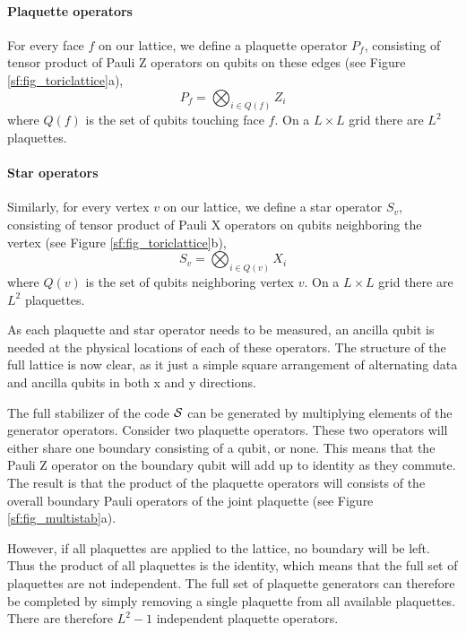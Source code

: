 \paragraph{Plaquette operators}
For every face $f$ on our lattice, we define a plaquette operator $P_f$, consisting of tensor product of Pauli Z operators on qubits on these edges (see Figure \ref{sf:fig_toriclattice}a),
\begin{equation}\label{eq:sf_plaquette}
  P_f = \bigotimes_{i\in Q(f)} Z_i
\end{equation}
where $Q(f)$ is the set of qubits touching face $f$. On a $L\times L$ grid there are $L^2$ plaquettes.

\paragraph{Star operators}

Similarly, for every vertex $v$ on our lattice, we define a star operator $S_v$, consisting of tensor product of Pauli X operators on qubits neighboring the vertex (see Figure \ref{sf:fig_toriclattice}b),
\begin{equation}\label{eq:sf_star}
  S_v = \bigotimes_{i\in Q(v)} X_i
\end{equation}
where $Q(v)$ is the set of qubits neighboring vertex $v$. On a $L\times L$ grid there are $L^2$ plaquettes.

As each plaquette and star operator needs to be measured, an ancilla qubit is needed at the physical locations of each of these operators. The structure of the full lattice is now clear, as it just a simple square arrangement of alternating data and ancilla qubits in both x and y directions.

The full stabilizer of the code $\mathcal{S}$ can be generated by multiplying elements of the generator operators. Consider two plaquette operators. These two operators will either share one boundary consisting of a qubit, or none. This means that the Pauli Z operator on the boundary qubit will add up to identity as they commute. The result is that the product of the plaquette operators will consists of the overall boundary Pauli operators of the joint plaquette (see Figure \ref{sf:fig_multistab}a).

However, if all plaquettes are applied to the lattice, no boundary will be left. Thus the product of all plaquettes is the identity, which means that the full set of plaquettes are not independent. The full set of plaquette generators can therefore be completed by simply removing a single plaquette from all available plaquettes. There are therefore $L^2 - 1$ independent plaquette operators.


